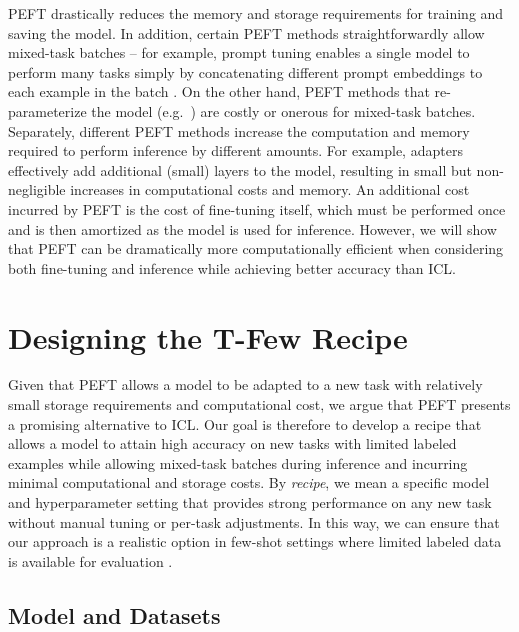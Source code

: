 PEFT drastically reduces the memory and storage requirements for training and saving the model. In addition, certain PEFT methods straightforwardly allow mixed-task batches -- for example, prompt tuning enables a single model to perform many tasks simply by concatenating different prompt embeddings to each example in the batch \cite{lester2021power}. On the other hand, PEFT methods that re-parameterize the model (e.g.\ \citep{aghajanyan2020intrinsic,hu2021lora}) are costly or onerous for mixed-task batches. Separately, different PEFT methods increase the computation and memory required to perform inference by different amounts. For example, adapters effectively add additional (small) layers to the model, resulting in small but non-negligible increases in computational costs and memory. An additional cost incurred by PEFT is the cost of fine-tuning itself, which must be performed once and is then amortized as the model is used for inference. However, we will show that PEFT can be dramatically more computationally efficient when considering both fine-tuning and inference while achieving better accuracy than ICL. 

\section{Designing the {\selectfont T-Few} Recipe}
\label{sec:tfew}

Given that PEFT allows a model to be adapted to a new task with relatively small storage requirements and computational cost, we argue that PEFT presents a promising alternative to ICL. Our goal is therefore to develop a recipe that allows a model to attain high accuracy on new tasks with limited labeled examples while allowing mixed-task batches during inference and incurring minimal computational and storage costs. By \textit{recipe}, we mean a specific model and hyperparameter setting that provides strong performance on any new task without manual tuning or per-task adjustments. In this way, we can ensure that our approach is a realistic option in few-shot settings where limited labeled data is available for evaluation \cite{perez2021true,oliver2018realistic}.

\subsection{Model and Datasets}
\label{sec:model_datasets}

